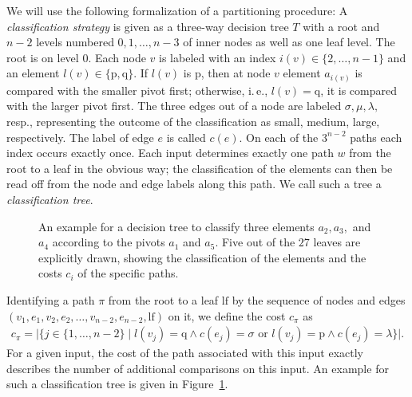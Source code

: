 \documentclass[prodmode,acmtalg]{acmsmall}
\begin{document}
We will use the following formalization of a partitioning
procedure: A \emph{classification
strategy} is given as a three-way
decision tree $T$ with a root and $n-2$ levels numbered $0, 1, \ldots, n - 3$
of inner nodes as well as one
leaf level. The root is on level $0$. Each node $v$ is labeled with an index
$i(v)
\in \{2,\ldots, n - 1\}$ and an element $l(v) \in \{\text{p}, \text{q}\}$. If
$l(v)$ is $\text{p}$, then at node $v$ element $a_{i(v)}$ is compared with the
smaller pivot first; otherwise, i.\,e., $l(v) = \text{q}$, it is compared with the
larger pivot first. 
 The three edges out of a node are labeled $\sigma, \mu, \lambda,$ resp.,
representing the outcome of the classification as small, medium, large,
respectively. The label of edge $e$ is called $c(e)$. 
On each of the $3^{n-2}$ paths each index occurs exactly
once.  Each input
determines exactly one path $w$ from the root to a leaf in the
obvious way; the
classification of the elements can then be read off from the node and edge
labels along this path. We call such a tree a \emph{classification tree}.
 \newcommand{\lv}[1]{\ensuremath{\textnormal{\textrm{level}}(#1)}}


\begin{figure}[bt]
    \centering
    \caption{An example for a decision tree to classify three elements $a_2,a_3,$ 
    and $a_4$ according to the pivots $a_1$ and $a_5$. 
    Five out of the $27$ leaves are explicitly drawn, showing the classification of the elements and 
    the costs $c_i$ of the specific paths.}
    \label{fig:decision:tree:ex1}
\end{figure}

Identifying a path $\pi$ from the root to a leaf $\text{lf}$ by the sequence of nodes and 
edges $(v_1,e_1,v_2,e_2,\ldots,v_{n-2}, e_{n-2}, \text{lf})$ on it, we define the cost $c_\pi$ as 
\begin{align*}
    c_\pi = \big|\big\{j \in
    \{1,\ldots,n-2\} \mid l(v_j) = 
\text{q} \wedge c(e_j) = \sigma  \text{ or } l(v_j) = \text{p} \wedge c(e_j) = \lambda \big\}\big|.
\end{align*}
For a given input, the cost of the path associated with this input exactly describes the number of additional
comparisons on this input. An example for such a classification tree is given in Figure~\ref{fig:decision:tree:ex1}.
\end{document}
